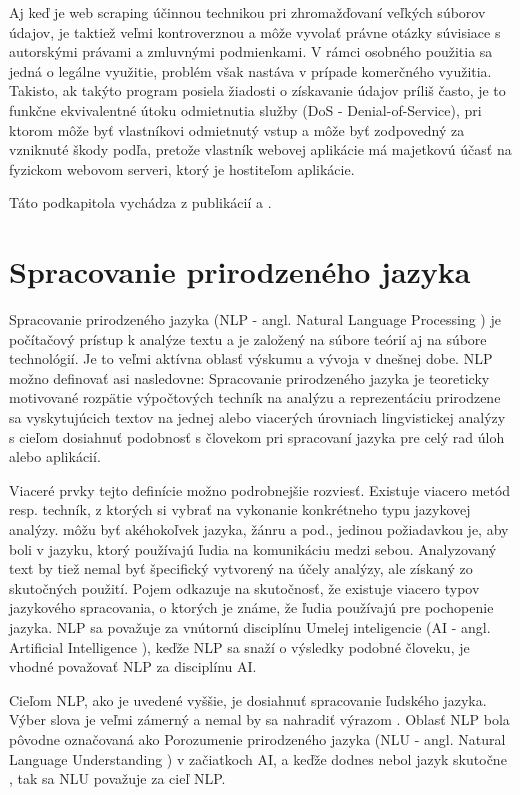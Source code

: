 Aj keď je web scraping účinnou technikou pri zhromažďovaní veľkých súborov údajov, je taktiež veľmi kontroverznou a môže vyvolať právne otázky súvisiace s autorskými právami a zmluvnými podmienkami. V rámci osobného použitia sa jedná o legálne využitie,  problém však nastáva v prípade komerčného využitia. Takisto, ak takýto program posiela žiadosti o získavanie údajov príliš často, je to funkčne ekvivalentné útoku odmietnutia služby (DoS - Denial-of-Service), pri ktorom môže byť vlastníkovi odmietnutý vstup a môže byť zodpovedný za vzniknuté škody podľa, pretože vlastník webovej aplikácie má majetkovú účasť na fyzickom webovom serveri, ktorý je hostiteľom aplikácie.

Táto podkapitola vychádza z publikácií \cite{Zhao:2017} a \cite{Sirisuriya:2015}.


\section{Spracovanie prirodzeného jazyka}

Spracovanie prirodzeného jazyka (NLP - angl. Natural Language Processing ) je počítačový prístup k analýze textu a je založený na súbore teórií aj na súbore technológií. Je to veľmi aktívna oblasť výskumu a vývoja v dnešnej dobe. NLP možno definovať asi nasledovne: Spracovanie prirodzeného jazyka je teoreticky motivované rozpätie výpočtových techník na analýzu a reprezentáciu prirodzene sa vyskytujúcich textov na jednej alebo viacerých úrovniach lingvistickej analýzy s cieľom dosiahnuť podobnosť s človekom pri spracovaní jazyka pre celý rad úloh alebo aplikácií.

Viaceré prvky tejto definície možno podrobnejšie rozviesť. Existuje viacero metód resp. techník, z ktorých si vybrať na vykonanie konkrétneho typu jazykovej analýzy.  môžu byť akéhokoľvek jazyka, žánru a pod., jedinou požiadavkou je, aby boli v jazyku, ktorý používajú ľudia na komunikáciu medzi sebou. Analyzovaný text by tiež nemal byť špecifický vytvorený na účely analýzy, ale získaný zo skutočných použití. Pojem  odkazuje na skutočnosť, že existuje viacero typov jazykového spracovania, o ktorých je známe, že ľudia používajú pre pochopenie jazyka. NLP sa považuje za vnútornú disciplínu Umelej inteligencie (AI  - angl. Artificial Intelligence ), keďže NLP sa snaží o výsledky podobné človeku, je vhodné považovať NLP za disciplínu AI.

Cieľom NLP, ako je uvedené vyššie, je dosiahnuť spracovanie ľudského jazyka. Výber slova  je veľmi zámerný a nemal by sa nahradiť výrazom . Oblasť NLP bola pôvodne označovaná ako Porozumenie prirodzeného jazyka (NLU - angl. Natural Language Understanding ) v začiatkoch AI, a keďže dodnes nebol jazyk skutočne , tak sa NLU považuje za cieľ NLP. 

